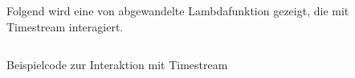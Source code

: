 \label{anhang:batch-codesample}
Folgend wird eine von  abgewandelte Lambdafunktion gezeigt, die mit Timestream interagiert.

\inputminted[frame=lines,breaklines=true]{javascript}{code/sample-db-lambda.js}
\begin{listing}[H]
    \caption{Beispielcode zur Interaktion mit Timestream}
    \label{fig:foo}
\end{listing}